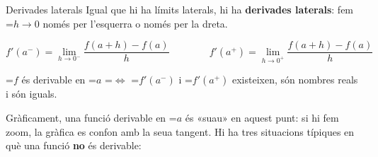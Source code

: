 \documentclass[11pt,a4paper]{article}
\newcommand{\fmm}[1]{\setbox0=\hbox{$#1$}\ifdim\wd0>\linewidth\[#1\]\else\mbox{\box0}\fi}
\begin{document}
\begin{fmdef}{Derivades laterals}
Igual que hi ha límits laterals, hi ha \textbf{derivades laterals}: fem \fmm{h\to0} només per l'esquerra o només per la dreta.

      
\[f'(a^-)=\lim_{h\to0^-}\frac{f(a+h)-f(a)}{h}\qquad\qquad f'(a^+)=\lim_{h\to0^+}\frac{f(a+h)-f(a)}{h}\]

      
\begin{center}\colorbox{fmyellow!45}{\parbox{0.9\linewidth}{\centering\strut \fmm{f} és derivable en \fmm{a} \fmm{\iff} \fmm{f'(a^-)} i \fmm{f'(a^+)} existeixen, són nombres reals i són iguals.\strut}}\end{center}

      

Gràficament, una funció derivable en \fmm{a} és «suau» en aquest punt: si hi fem zoom, la gràfica es confon amb la seua tangent. Hi ha tres situacions típiques en què una funció \textbf{no} és derivable:


\end{fmdef}
\end{document}
